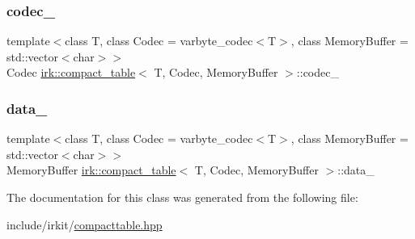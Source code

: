 \subsubsection{\texorpdfstring{codec\+\_\+}{codec\_}}
{\footnotesize\ttfamily template$<$class T, class Codec = varbyte\+\_\+codec$<$\+T$>$, class Memory\+Buffer = std\+::vector$<$char$>$$>$ \\
Codec \mbox{\hyperlink{classirk_1_1compact__table}{irk\+::compact\+\_\+table}}$<$ T, Codec, Memory\+Buffer $>$\+::codec\+\_\+\hspace{0.3cm}{\ttfamily [protected]}}

\mbox{\label{classirk_1_1compact__table_a8a8f2eccb0ccc0258c158c51dfbfdbaa}} 
\subsubsection{\texorpdfstring{data\+\_\+}{data\_}}
{\footnotesize\ttfamily template$<$class T, class Codec = varbyte\+\_\+codec$<$\+T$>$, class Memory\+Buffer = std\+::vector$<$char$>$$>$ \\
Memory\+Buffer \mbox{\hyperlink{classirk_1_1compact__table}{irk\+::compact\+\_\+table}}$<$ T, Codec, Memory\+Buffer $>$\+::data\+\_\+\hspace{0.3cm}{\ttfamily [protected]}}



The documentation for this class was generated from the following file\+:\begin{DoxyCompactItemize}
\item 
include/irkit/\mbox{\hyperlink{compacttable_8hpp}{compacttable.\+hpp}}\end{DoxyCompactItemize}
